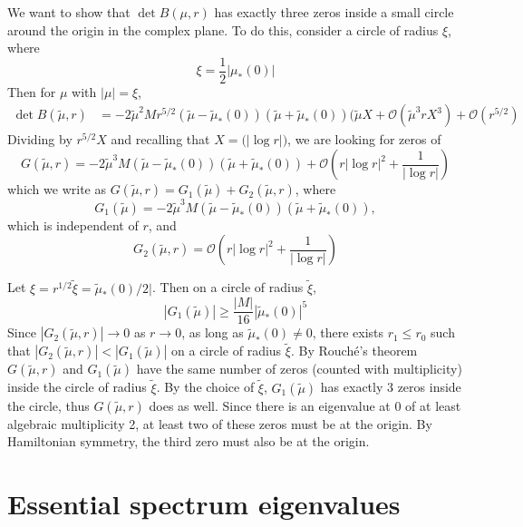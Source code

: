 \documentclass[thesis.tex]{subfiles}
\begin{document}
We want to show that $\det B(\mu, r)$ has exactly three zeros inside a small circle around the origin in the complex plane. To do this, consider a circle of radius $\xi$, where
\[
\xi = \frac{1}{2}|\mu_*(0)|
\]
Then for $\mu$ with $|\mu| = \xi$,
\begin{equation*}
\begin{aligned}
\det B(\tilde{\mu}, r) &= -2 \tilde{\mu}^2 M r^{5/2} (\tilde{\mu} - \tilde{\mu}_*(0)) (\tilde{\mu} + \tilde{\mu}_*(0))( \tilde{\mu} X + \mathcal{O}(\tilde{\mu}^3 r X^3) + \mathcal{O}( r^{5/2} )
\end{aligned}
\end{equation*}
Dividing by $r^{5/2}X$ and recalling that $X = \mathcal(|\log r|)$, we are looking for zeros of
\[
G(\tilde{\mu}, r) = -2 \tilde{\mu}^3 M (\tilde{\mu} - \tilde{\mu}_*(0)) (\tilde{\mu} + \tilde{\mu}_*(0)) + \mathcal{O}\left( r |\log r|^2 + \frac{1}{|\log r|} \right)
\]
which we write as $G(\tilde{\mu}, r) = G_1(\tilde{\mu}) + G_2(\tilde{\mu}, r)$, where 
\[
G_1(\tilde{\mu}) = -2 \tilde{\mu}^3 M (\tilde{\mu} - \tilde{\mu}_*(0)) (\tilde{\mu} + \tilde{\mu}_*(0)),
\]
which is independent of $r$, and
\[
G_2(\tilde{\mu}, r) = \mathcal{O}\left( r |\log r|^2 + \frac{1}{|\log r|} \right)
\]

Let $\xi = r^{1/2} \tilde{\xi} = \tilde{\mu}_*(0)/2|$. Then on a circle of radius $\tilde{\xi}$,
\[
|G_1(\tilde{\mu})| \geq \frac{|M|}{16}|\tilde{\mu}_*(0)|^5
\]
Since $|G_2(\tilde{\mu}, r)| \rightarrow 0$ as $r \rightarrow 0$, as long as $\tilde{\mu}_*(0) \neq 0$, there exists $r_1 \leq r_0$ such that $|G_2(\tilde{\mu}, r)| < |G_1(\tilde{\mu})|$ on a circle of radius $\tilde{\xi}$. By Rouch\'{e}'s theorem $G(\tilde{\mu}, r)$ and $G_1(\tilde{\mu})$ have the same number of zeros (counted with multiplicity) inside the circle of radius $\tilde{\xi}$. By the choice of $\tilde{\xi}$, $G_1(\tilde{\mu})$ has exactly 3 zeros inside the circle, thus $G(\tilde{\mu}, r)$ does as well. Since there is an eigenvalue at 0 of at least algebraic multiplicity 2, at least two of these zeros must be at the origin. By Hamiltonian symmetry, the third zero must also be at the origin.

\section{Essential spectrum eigenvalues}
\end{document}
